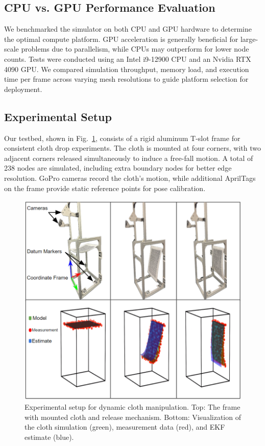 \subsection{CPU vs. GPU Performance Evaluation}
We benchmarked the simulator on both CPU and GPU hardware to determine the optimal compute platform. GPU acceleration is generally beneficial for large-scale problems due to parallelism, while CPUs may outperform for lower node counts. Tests were conducted using an Intel i9-12900 CPU and an Nvidia RTX 4090 GPU. We compared simulation throughput, memory load, and execution time per frame across varying mesh resolutions to guide platform selection for deployment.

\subsection{Experimental Setup}
Our testbed, shown in Fig.~\ref{fig:setup}, consists of a rigid aluminum T-slot frame for consistent cloth drop experiments. The cloth is mounted at four corners, with two adjacent corners released simultaneously to induce a free-fall motion. A total of 238 nodes are simulated, including extra boundary nodes for better edge resolution. GoPro cameras record the cloth's motion, while additional AprilTags on the frame provide static reference points for pose calibration.

\begin{figure}[H]
\centering
\includegraphics[width=\linewidth]{CLOTH REPORT PICS/Setup.png}
\caption{Experimental setup for dynamic cloth manipulation. Top: The frame with mounted cloth and release mechanism. Bottom: Visualization of the cloth simulation (green), measurement data (red), and EKF estimate (blue).}
\label{fig:setup}
\end{figure}

